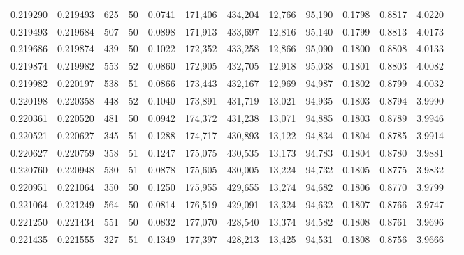 \begin{tabular}{rrrrrrrrrrrrr}
0.219290 & 0.219493 &   625 &  50 &                                     0.0741 & 171,406 & 434,204 &  12,766 &  95,190 & 0.1798 & 0.8817 & 4.0220 \\
0.219493 & 0.219684 &   507 &  50 &                                     0.0898 & 171,913 & 433,697 &  12,816 &  95,140 & 0.1799 & 0.8813 & 4.0173 \\
0.219686 & 0.219874 &   439 &  50 &                                     0.1022 & 172,352 & 433,258 &  12,866 &  95,090 & 0.1800 & 0.8808 & 4.0133 \\
0.219874 & 0.219982 &   553 &  52 &                                     0.0860 & 172,905 & 432,705 &  12,918 &  95,038 & 0.1801 & 0.8803 & 4.0082 \\
0.219982 & 0.220197 &   538 &  51 &                                     0.0866 & 173,443 & 432,167 &  12,969 &  94,987 & 0.1802 & 0.8799 & 4.0032 \\
0.220198 & 0.220358 &   448 &  52 &                                     0.1040 & 173,891 & 431,719 &  13,021 &  94,935 & 0.1803 & 0.8794 & 3.9990 \\
0.220361 & 0.220520 &   481 &  50 &                                     0.0942 & 174,372 & 431,238 &  13,071 &  94,885 & 0.1803 & 0.8789 & 3.9946 \\
0.220521 & 0.220627 &   345 &  51 &                                     0.1288 & 174,717 & 430,893 &  13,122 &  94,834 & 0.1804 & 0.8785 & 3.9914 \\
0.220627 & 0.220759 &   358 &  51 &                                     0.1247 & 175,075 & 430,535 &  13,173 &  94,783 & 0.1804 & 0.8780 & 3.9881 \\
0.220760 & 0.220948 &   530 &  51 &                                     0.0878 & 175,605 & 430,005 &  13,224 &  94,732 & 0.1805 & 0.8775 & 3.9832 \\
0.220951 & 0.221064 &   350 &  50 &                                     0.1250 & 175,955 & 429,655 &  13,274 &  94,682 & 0.1806 & 0.8770 & 3.9799 \\
0.221064 & 0.221249 &   564 &  50 &                                     0.0814 & 176,519 & 429,091 &  13,324 &  94,632 & 0.1807 & 0.8766 & 3.9747 \\
0.221250 & 0.221434 &   551 &  50 &                                     0.0832 & 177,070 & 428,540 &  13,374 &  94,582 & 0.1808 & 0.8761 & 3.9696 \\
0.221435 & 0.221555 &   327 &  51 &                                     0.1349 & 177,397 & 428,213 &  13,425 &  94,531 & 0.1808 & 0.8756 & 3.9666 \\

\end{tabular}
